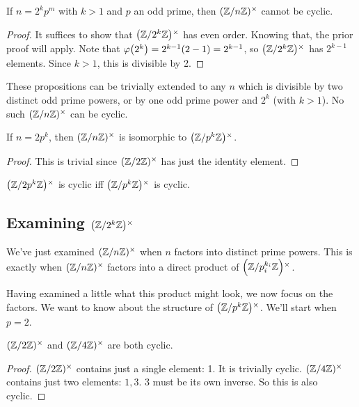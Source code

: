 \begin{corollary}
  If $n = 2^k p^m$ with $k > 1$ and $p$ an odd prime, then $\Zmodnx$
  cannot be cyclic.
\end{corollary}

\begin{proof}
  It suffices to show that $\Zmodx{2^k}$ has even order. Knowing that,
  the prior proof will apply. Note that $\vphif{2^k} = 2^{k-1}(2 - 1) =
  2^{k-1}$, so $\Zmodx{2^k}$ has $2^{k-1}$ elements. Since $k>1$, this
  is divisible by 2.
\end{proof}

\begin{remark}
  These propositions can be trivially extended to any $n$ which is
  divisible by two distinct odd prime powers, or by one odd prime power
  and $2^k$ (with $k > 1$). No such $\Zmodnx$ can be cyclic.
\end{remark}

\begin{corollary}
  If $n = 2 p^k$, then $\Zmodnx$ is isomorphic to $\Zmodx{p^k}$.
\end{corollary}

\begin{proof}
  This is trivial since $\Zmodx{2}$ has just the identity element.
\end{proof}

\begin{corollary}
  $\Zmodx{2 p^k}$ is cyclic iff $\Zmodx{p^k}$ is cyclic.
\end{corollary}

\subsection{Examining $\Zmodx{2^k}$}

\begin{remark}
  We've just examined $\Zmodnx$ when $n$ factors into distinct prime
  powers. This is exactly when $\Zmodnx$ factors into a direct product
  of $\Zmodx{p_i^{k_i}}$.

  Having examined a little what this product might look, we now focus on
  the factors. We want to know about the structure of $\Zmodx{p^k}$.
  We'll start when $p = 2$.
\end{remark}

\begin{proposition}
  $\Zmodx{2}$ and $\Zmodx{4}$ are both cyclic.
\end{proposition}

\begin{proof}
  $\Zmodx{2}$ contains just a single element: 1. It is trivially cyclic.
  $\Zmodx{4}$ contains just two elements: $1, 3$. $3$ must be its own
  inverse. So this is also cyclic.
\end{proof}

